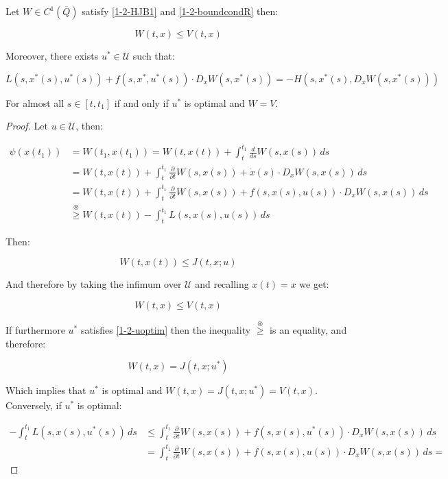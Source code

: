 \begin{theorem}\label{1-2-Verificationthe}
    Let $W\in C^1(\overline{Q})$ satisfy \ref{1-2-HJB1} and \ref{1-2-boundcondR} then:

    \[W(t,x)\leq V(t,x)\]

    Moreover, there exists $u^{\ast}\in\mathcal{U}$ such that:

    \begin{equation}\label{1-2-uoptim}
        L(s,x^{\ast}(s),u^{\ast}(s)) + f(s,x^{\ast},u^{\ast}(s))\cdot D_xW(s,x^{\ast}(s)) = - H(s,x^{\ast}(s),D_xW(s,x^{\ast}(s)))
    \end{equation}

    For almost all $s\in[t,t_1]$ if and only if $u^{\ast}$ is optimal and $W=V$.

    \begin{proof}
        Let $u\in\mathcal{U}$, then:

        \begin{align*}
            \psi(x(t_1)) & = W(t_1,x(t_1)) = W(t,x(t)) + \int_t^{t_1}\frac{d}{ds}W(s,x(s)) \,ds \\
            & = W(t,x(t)) + \int_t^{t_1} \frac{\partial}{\partial t}W(s,x(s)) + \dot{x}(s)\cdot D_xW(s,x(s)) \,ds \\
            & = W(t,x(t)) + \int_t^{t_1} \frac{\partial}{\partial t}W(s,x(s)) + f(s,x(s),u(s))\cdot D_xW(s,x(s)) \,ds \\
            & \overset{\circledast}{\geq} W(t,x(t)) - \int_t^{t_1} L(s,x(s),u(s)) \,ds  
        \end{align*}

        Then:

        \[W(t,x(t)) \leq J(t,x;u)\]

        And therefore by taking the infimum over $\mathcal{U}$ and recalling $x(t)=x$ we get:

        \[W(t,x) \leq V(t,x)\]

        If furthermore $u^{\ast}$ satisfies \ref{1-2-uoptim} then the inequality $\overset{\circledast}{\geq}$ is an equality, and therefore:

        \[W(t,x) = J(t,x;u^{\ast})\]

        Which implies that $u^{\ast}$ is optimal and $W(t,x)=J(t,x;u^{\ast})=V(t,x)$. Conversely, if $u^{\ast}$ is optimal:

        \begin{align*}
            - \int_t^{t_1} L(s,x(s),u^{\ast}(s)) \,ds & \leq \int_t^{t_1} \frac{\partial}{\partial t}W(s,x(s)) + f(s,x(s),u^{\ast}(s))\cdot D_xW(s,x(s)) \,ds \\
            & = \int_t^{t_1} \frac{\partial}{\partial t}W(s,x(s)) + f(s,x(s),u(s))\cdot D_xW(s,x(s)) \,ds = 
        \end{align*}
    \end{proof} 
\end{theorem}


